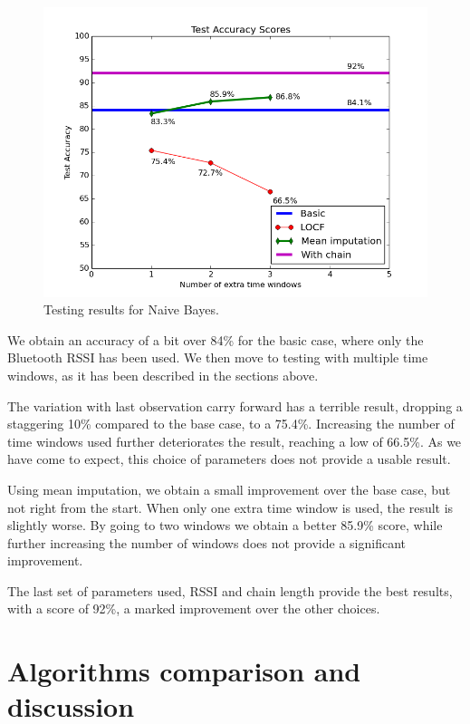 \begin{figure}[h]
	\begin{center}
		\includegraphics[scale=0.7]{figures/naive_tot.png}
	\end{center}
	
	\caption{Testing results for Naive Bayes.}
	\label{pic:naive_tot}

\end{figure}

We obtain an accuracy of a bit over 84\% for the basic case, where only the Bluetooth RSSI has been used. We then move to testing with multiple time windows, as it has been described in the sections above.

The variation with last observation carry forward has a terrible result, dropping a staggering 10\% compared to the base case, to a 75.4\%. Increasing the number of time windows used further deteriorates the result, reaching a low of 66.5\%. As we have come to expect, this choice of parameters does not provide a usable result.

Using mean imputation, we obtain a small improvement over the base case, but not right from the start. When only one extra time window is used, the result is slightly worse. By going to two windows we obtain a better 85.9\% score, while further increasing the number of windows does not provide a significant improvement. 

The last set of parameters used, RSSI and chain length provide the best results, with a score of 92\%, a marked improvement over the other choices.  

\section {Algorithms comparison and discussion}

